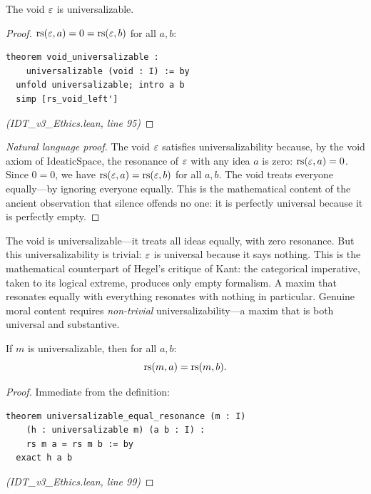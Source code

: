 \begin{theorem}
\label{thm:void-universalizable}
The void $\varepsilon$ is universalizable.
\end{theorem}

\begin{proof}
$\mathrm{rs}(\varepsilon, a) = 0 = \mathrm{rs}(\varepsilon, b)$ for all $a, b$:
\begin{lstlisting}
theorem void_universalizable :
    universalizable (void : I) := by
  unfold universalizable; intro a b
  simp [rs_void_left']
\end{lstlisting}
\textit{(IDT\_v3\_Ethics.lean, line 95)}
\end{proof}

\begin{proof}[Natural language proof]
The void $\varepsilon$ satisfies universalizability because, by the void axiom of
$\mathrm{IdeaticSpace}$, the resonance of $\varepsilon$ with any idea $a$ is zero:
$\mathrm{rs}(\varepsilon, a) = 0$. Since $0 = 0$, we have $\mathrm{rs}(\varepsilon, a) = \mathrm{rs}(\varepsilon, b)$
for all $a, b$. The void treats everyone equally---by ignoring everyone equally.
This is the mathematical content of the ancient observation that silence
offends no one: it is perfectly universal because it is perfectly empty.
\end{proof}

\begin{interpretation}
The void is universalizable---it treats all ideas equally, with zero resonance.
But this universalizability is trivial: $\varepsilon$ is universal because it says
nothing. This is the mathematical counterpart of Hegel's critique of Kant:
the categorical imperative, taken to its logical extreme, produces only empty
formalism. A maxim that resonates equally with everything resonates with nothing
in particular. Genuine moral content requires \emph{non-trivial}
universalizability---a maxim that is both universal and substantive.
\end{interpretation}

\begin{theorem}
\label{thm:universalizable-equal}
If $m$ is universalizable, then for all $a, b$:
\[
  \mathrm{rs}(m, a) = \mathrm{rs}(m, b).
\]
\end{theorem}

\begin{proof}
Immediate from the definition:
\begin{lstlisting}
theorem universalizable_equal_resonance (m : I)
    (h : universalizable m) (a b : I) :
    rs m a = rs m b := by
  exact h a b
\end{lstlisting}
\textit{(IDT\_v3\_Ethics.lean, line 99)}
\end{proof}

